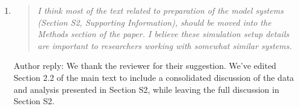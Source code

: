 \documentclass{article}
\begin{document}
\begin{enumerate}

    
    \item \begin{quote}
    
    \textit{I think most of the text related to preparation of the model systems (Section S2, 
    Supporting Information), should be moved into the Methods section of the paper. I believe 
    these simulation setup details are important to researchers working with somewhat similar 
    systems.}
    
    \end{quote}
    
    Author reply: We thank the reviewer for their suggestion. We've edited Section 2.2 of the main
    text to include a consolidated discussion of the data and analysis presented in Section S2, 
    while leaving the full discussion in Section S2.
    

\end{enumerate}
\end{document}
